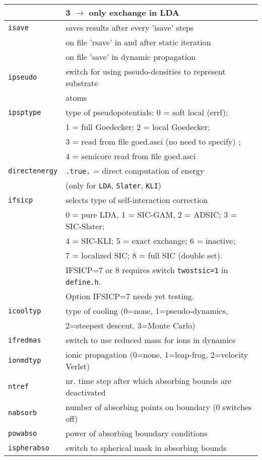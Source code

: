 \documentclass[11pt,a4paper]{article}
\begin{document}
\begin{table}[!htbp]
\begin{tabular}{|p{3.5cm}|p{11.2cm}|}
						& 3 $\rightarrow$ only exchange in  LDA \\
					\hline
					\texttt{isave}& saves results after every 'isave' steps \\
					\texttt{}& on file 'rsave' in and after static iteration\\
					\texttt{}& on file 'save' in dynamic propagation\\
					\hline
					\texttt{ipseudo}& switch for using pseudo-densities to represent substrate\\
					\texttt{}& atoms \\
					\hline
					\texttt{ipsptype}& type of pseudopotentials: 0 = soft local (errf);\\
						& 1 = full Goedecker; 2 = local Goedecker;\\
						& 3 = read from file goed.asci (no need to specify)  ;\\
						& 4 = semicore read from file goed.asci\\
					\hline
					\texttt{directenergy}   & \texttt{.true.} = direct computation of energy \\
						& (only for \texttt{LDA}, \texttt{Slater}, \texttt{KLI})\\
					\hline
					\texttt{ifsicp}& selects type of self-interaction correction\\
						&  0 = pure LDA, 1 = SIC-GAM, 2 = ADSIC; 3 = SIC-Slater; \\
						&  4 = SIC-KLI; 5 = exact exchange; 6 = inactive;\\
						&  7 = localized SIC;  8 = full SIC (double set).\\
						& IFSICP=7 or 8 requires switch \texttt{twostsic=1} in \texttt{define.h}.\\
						& Option IFSICP=7 needs yet testing.\\
					\hline
					\texttt{icooltyp}& type of cooling (0=none, 1=pseudo-dynamics,\\
					\texttt{}& 2=steepest descent, 3=Monte Carlo)\\
					\hline
					\texttt{ifredmas}& switch to use reduced mass for ions in dynamics\\
					\hline
					\texttt{ionmdtyp}& ionic propagation (0=none, 1=leap-frog, 2=velocity Verlet)\\
					\hline
					\texttt{ntref}& nr. time step after which absorbing bounds are deactivated\\
					\hline
					\texttt{nabsorb}& number of absorbing points on boundary (0 switches off)\\
					\hline
					\texttt{powabso}& power of absorbing boundary conditions\\
					\hline
					\texttt{ispherabso}& switch to spherical mask in absorbing bounds\\
					\hline
				\end{tabular}
			\end{table}
\end{document}
